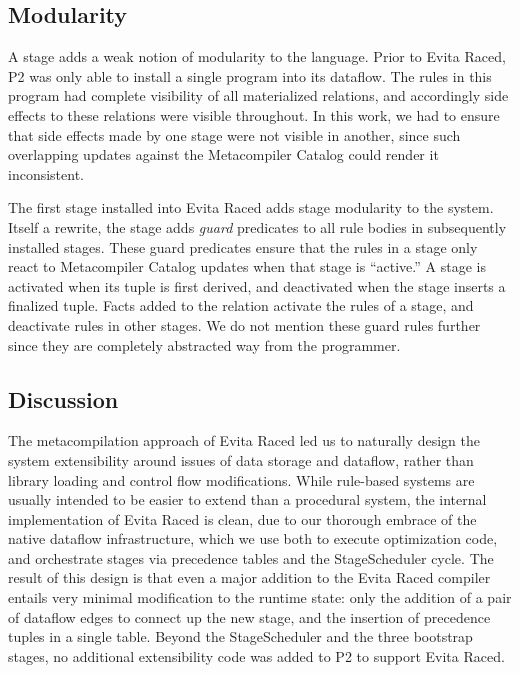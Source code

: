 % 



\subsection{Modularity}
\label{ch:evita:sec:modularity}

A stage adds a weak notion of modularity to the \OVERLOG language.  Prior to
Evita Raced, P2 was only able to install a single \OVERLOG program into its
dataflow.  The rules in this program had complete visibility of all
materialized relations, and accordingly side effects to these relations were
visible throughout.  In this work, we had to ensure that side effects made by
one stage were not visible in another, since such overlapping updates against
the Metacompiler Catalog could render it inconsistent.

The first \OVERLOG stage installed into Evita Raced adds stage modularity to
the system.  Itself a rewrite, the stage adds {\em guard} predicates to all
rule bodies in subsequently installed \OVERLOG stages.  These guard predicates
ensure that the rules in a stage only react to Metacompiler Catalog updates
when that stage is ``active.'' A stage is activated when its
 tuple is first derived, and deactivated when the
stage inserts a finalized  tuple.  Facts added to the 
relation activate the rules of a stage, and deactivate rules in other stages.
We do not mention these guard rules further since they are completely
abstracted way from the programmer.

\subsection{Discussion}

The metacompilation approach of Evita Raced led us to naturally design the
system extensibility around issues of data storage and dataflow, rather than
library loading and control flow modifications.  While rule-based systems are
usually intended to be easier to extend than a procedural system, the internal
implementation of Evita Raced is clean, due to our thorough embrace of the
native dataflow infrastructure, which we use both to execute optimization code,
and orchestrate stages via precedence tables and the StageScheduler cycle.  The
result of this design is that even a major addition to the Evita Raced compiler
entails very minimal modification to the runtime state: only the addition of a
pair of dataflow edges to connect up the new stage, and the insertion of
precedence tuples in a single table.  Beyond the StageScheduler and the three
bootstrap stages, no additional extensibility code was added to P2 to support
Evita Raced.

